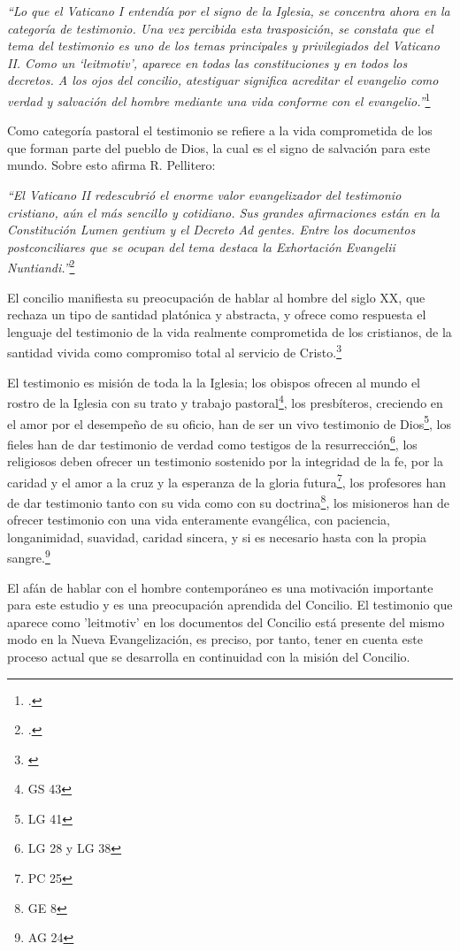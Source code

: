 \documentclass[11pt]{article}
\begin{document}
\emph{
``Lo que el Vaticano I entendía por el signo de la Iglesia, se concentra ahora en la categoría de testimonio. Una vez percibida esta trasposición, se constata que el tema del testimonio es uno de los temas principales y privilegiados del Vaticano II. Como un `leitmotiv', aparece en todas las constituciones y en todos los decretos. A los ojos del concilio, atestiguar significa acreditar el evangelio como verdad y salvación del hombre mediante una vida conforme con el evangelio.''}\footcite[1532]{dicctf}

Como categoría pastoral el testimonio se refiere a la vida comprometida de los que forman parte del pueblo de Dios, la cual es el signo de salvación para este mundo. Sobre esto afirma R. Pellitero:

\emph{
``El Vaticano II redescubrió el enorme valor evangelizador del testimonio cristiano, aún el más sencillo y cotidiano. Sus grandes afirmaciones están en la Constitución Lumen gentium y el Decreto Ad gentes. Entre los documentos postconciliares que se ocupan del tema destaca la Exhortación Evangelii Nuntiandi.''}\footcite[378--379]{ftcpellitero}

El concilio manifiesta su preocupación de hablar al hombre del siglo XX, que rechaza un tipo de santidad platónica y abstracta, y ofrece como respuesta el lenguaje del testimonio de la vida realmente comprometida de los cristianos, de la santidad vivida como compromiso total al servicio de Cristo.\footnote{\cite[1532 y 1533]{dicctf}} 

El testimonio es misión de toda la la Iglesia; los obispos ofrecen al mundo el rostro de la Iglesia con su trato y trabajo pastoral\footnote{GS 43}, los presbíteros, creciendo en el amor por el desempeño de su oficio, han de ser un vivo testimonio de Dios\footnote{LG 41}, los fieles han de dar testimonio de verdad como testigos de la resurrección\footnote{LG 28 y LG 38}, los religiosos deben ofrecer un testimonio sostenido por la integridad de la fe, por la caridad y el amor a la cruz y la esperanza de la gloria futura\footnote{PC 25}, los profesores han de dar testimonio tanto con su vida como con su doctrina\footnote{GE 8}, los misioneros han de ofrecer testimonio con una vida enteramente evangélica, con paciencia, longanimidad, suavidad, caridad sincera, y si es necesario hasta con la propia sangre.\footnote{AG 24}

El afán de hablar con el hombre contemporáneo es una motivación importante para este estudio y es una preocupación aprendida del Concilio. El testimonio que aparece como 'leitmotiv' en los documentos del Concilio está presente del mismo modo en la Nueva Evangelización, es preciso, por tanto, tener en cuenta este proceso actual que se desarrolla en continuidad con la misión del Concilio. 
\end{document}
